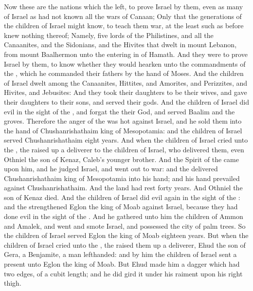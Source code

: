 \begin{biblechapter} %
\verse Now these are the nations which the \LORD left, to prove Israel by them, even as many of Israel as had not known all the wars of Canaan;
\verse Only that the generations of the children of Israel might know, to teach them war, at the least such as before knew nothing thereof;
\verse Namely, five lords of the Philistines, and all the Canaanites, and the Sidonians, and the Hivites that dwelt in mount Lebanon, from mount Baalhermon unto the entering in of Hamath.
\verse And they were to prove Israel by them, to know whether they would hearken unto the commandments of the \LORD, which he commanded their fathers by the hand of Moses.
\verse And the children of Israel dwelt among the Canaanites, Hittites, and Amorites, and Perizzites, and Hivites, and Jebusites:
\verse And they took their daughters to be their wives, and gave their daughters to their sons, and served their gods.
 And the children of Israel did evil in the sight of the \LORD, and forgat the \LORD their God, and served Baalim and the groves.
\verse Therefore the anger of the \LORD was hot against Israel, and he sold them into the hand of Chushanrishathaim king of Mesopotamia: and the children of Israel served Chushanrishathaim eight years.
\verse And when the children of Israel cried unto the \LORD, the \LORD raised up a deliverer to the children of Israel, who delivered them, even Othniel the son of Kenaz, Caleb's younger brother.
\verse And the Spirit of the \LORD came upon him, and he judged Israel, and went out to war: and the \LORD delivered Chushanrishathaim king of Mesopotamia into his hand; and his hand prevailed against Chushanrishathaim.
\verse And the land had rest forty years. And Othniel the son of Kenaz died.
 And the children of Israel did evil again in the sight of the \LORD: and the \LORD strengthened Eglon the king of Moab against Israel, because they had done evil in the sight of the \LORD.
\verse And he gathered unto him the children of Ammon and Amalek, and went and smote Israel, and possessed the city of palm trees.
\verse So the children of Israel served Eglon the king of Moab eighteen years.
\verse But when the children of Israel cried unto the \LORD, the \LORD raised them up a deliverer, Ehud the son of Gera, a Benjamite, a man lefthanded: and by him the children of Israel sent a present unto Eglon the king of Moab.
\verse But Ehud made him a dagger which had two edges, of a cubit length; and he did gird it under his raiment upon his right thigh.

\end{biblechapter}
